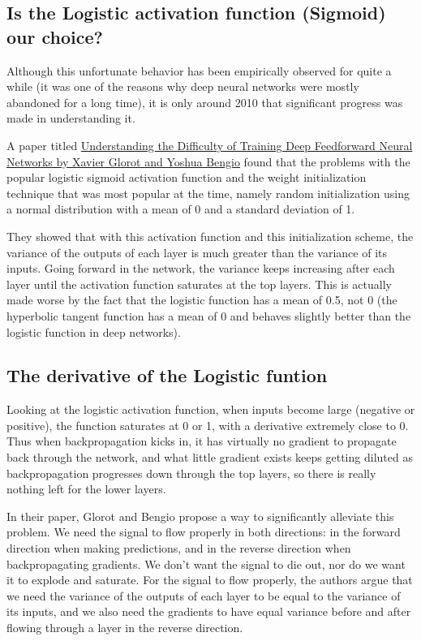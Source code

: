 \documentclass[%
oneside,                 %
final,                   %
10pt]{article}
\begin{document}
\subsection*{Is the Logistic activation function (Sigmoid)  our choice?}

Although this unfortunate behavior has been empirically observed for
quite a while (it was one of the reasons why deep neural networks were
mostly abandoned for a long time), it is only around 2010 that
significant progress was made in understanding it.

A paper titled \href{{http://proceedings.mlr.press/v9/glorot10a.html}}{Understanding the Difficulty of Training Deep
Feedforward Neural Networks by Xavier Glorot and Yoshua Bengio} found that
the problems with the popular logistic
sigmoid activation function and the weight initialization technique
that was most popular at the time, namely random initialization using
a normal distribution with a mean of 0 and a standard deviation of
1. 

They showed that with this activation function and this
initialization scheme, the variance of the outputs of each layer is
much greater than the variance of its inputs. Going forward in the
network, the variance keeps increasing after each layer until the
activation function saturates at the top layers. This is actually made
worse by the fact that the logistic function has a mean of 0.5, not 0
(the hyperbolic tangent function has a mean of 0 and behaves slightly
better than the logistic function in deep networks).


\subsection*{The derivative of the Logistic funtion}

Looking at the logistic activation function, when inputs become large
(negative or positive), the function saturates at 0 or 1, with a
derivative extremely close to 0. Thus when backpropagation kicks in,
it has virtually no gradient to propagate back through the network,
and what little gradient exists keeps getting diluted as
backpropagation progresses down through the top layers, so there is
really nothing left for the lower layers.

In their paper, Glorot and Bengio propose a way to significantly
alleviate this problem. We need the signal to flow properly in both
directions: in the forward direction when making predictions, and in
the reverse direction when backpropagating gradients. We don’t want
the signal to die out, nor do we want it to explode and saturate. For
the signal to flow properly, the authors argue that we need the
variance of the outputs of each layer to be equal to the variance of
its inputs, and we also need the gradients to have equal variance
before and after flowing through a layer in the reverse direction.
\end{document}
